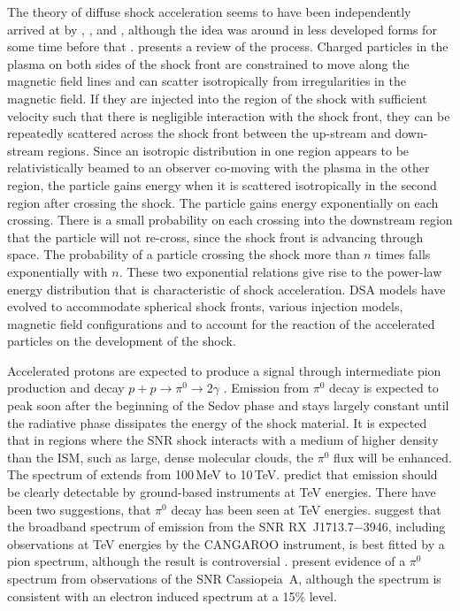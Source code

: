 The theory of diffuse shock acceleration seems to have been
independently arrived at by \citet{REF::KRYMSKII::DOSSR1977},
\citet{REF::AXFORD::ICRC1977}, \citet{REF::BELL::MNRAS1978} and 
\citet{REF::BLANDFORD_OSTRIKER::APJ1978}, although the idea was
around in less developed forms for some time before that
\citep{REF::FERMI::PR1949}. \citet{REF::DRURY::RPP1983} presents a
review of the process.  Charged particles in the plasma on both sides
of the shock front are constrained to move along the magnetic field
lines and can scatter isotropically from irregularities in the
magnetic field. If they are injected into the region of the shock with
sufficient velocity such that there is negligible interaction with the
shock front, they can be repeatedly scattered across the shock front
between the up-stream and down-stream regions. Since an isotropic
distribution in one region appears to be relativistically beamed to an
observer co-moving with the plasma in the other region, the particle
gains energy when it is scattered isotropically in the second region
after crossing the shock. The particle gains energy exponentially on
each crossing. There is a small probability on each crossing into the
downstream region that the particle will not re-cross, since the shock
front is advancing through space. The probability of a particle
crossing the shock more than $n$ times falls exponentially with
$n$. These two exponential relations give rise to the power-law energy
distribution that is characteristic of shock acceleration. DSA models
have evolved to accommodate spherical shock fronts, various injection
models, magnetic field configurations and to account for the reaction
of the accelerated particles on the development of the shock.

Accelerated protons are expected to produce a \Gray signal through
intermediate pion production and decay
$p+p\rightarrow\pi^0\rightarrow2\gamma$ \citep{REF::DAV::AA1994}.
Emission from $\pi^0$ decay is expected to peak soon after the
beginning of the Sedov phase and stays largely constant until the
radiative phase dissipates the energy of the shock material. It is
expected that in regions where the SNR shock interacts with a medium
of higher density than the ISM, such as large, dense molecular clouds,
the $\pi^0$ flux will be enhanced. The spectrum of
\Grays extends from 100\,MeV to 10\,TeV. \citet{REF::DAV::AA1994}
predict that \Gray emission should be clearly detectable by
ground-based instruments at TeV energies. There have been two
suggestions, that $\pi^0$ decay has been seen at TeV energies.
\citet{REF::ENOMOTO::NATURE2002} suggest that the broadband
spectrum of emission from the SNR RX~J1713.7$-$3946, including
observations at TeV energies by the CANGAROO instrument, is best
fitted by a pion spectrum, although the result is controversial
\citep{REF::REIMER_POHL::AA2002, REF::BUTT::NATURE2002}. 
\citet{REF::AHARONIAN::AA2001}
present evidence of a $\pi^0$ spectrum from observations of
the SNR Cassiopeia~A, although the spectrum is consistent with
an electron induced spectrum at a 15\% level.

